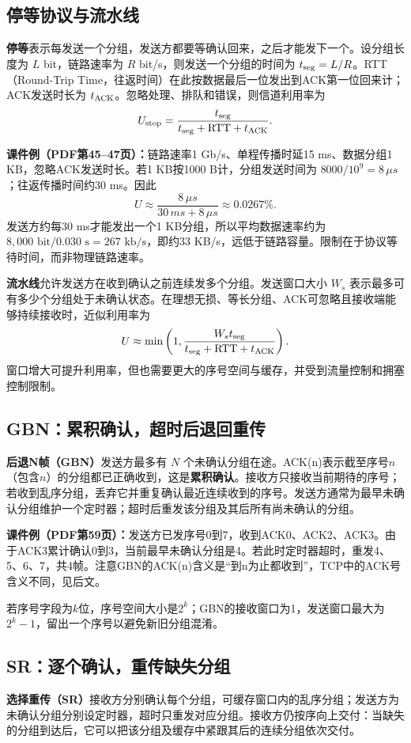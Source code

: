 \subsection{停等协议与流水线}
\textbf{停等}表示每发送一个分组，发送方都要等确认回来，之后才能发下一个。设分组长度为 $L$ bit，链路速率为 $R$ bit/s，则发送一个分组的时间为 $t_{\rm seg}=L/R$。RTT（Round-Trip Time，往返时间）在此按数据最后一位发出到ACK第一位回来计；ACK发送时长为 $t_{\rm ACK}$。忽略处理、排队和错误，则信道利用率为
\[
U_{\rm stop}=\frac{t_{\rm seg}}{t_{\rm seg}+\mathrm{RTT}+t_{\rm ACK}}.
\]

\textbf{课件例（PDF第45--47页）：}链路速率1 Gb/s、单程传播时延15 ms、数据分组1 KB，忽略ACK发送时长。若1 KB按1000 B计，分组发送时间为 $8000/10^9=8\,\mu s$；往返传播时间约30 ms。因此
\[
U\approx\frac{8\,\mu s}{30\,ms+8\,\mu s}\approx0.0267\%.
\]
发送方约每30 ms才能发出一个1 KB分组，所以平均数据速率约为$8{,}000\text{ bit}/0.030\text{ s}=267\text{ kb/s}$，即约33 KB/s，远低于链路容量。限制在于协议等待时间，而非物理链路速率。

\textbf{流水线}允许发送方在收到确认之前连续发多个分组。发送窗口大小 $W_s$ 表示最多可有多少个分组处于未确认状态。在理想无损、等长分组、ACK可忽略且接收端能够持续接收时，近似利用率为
\[
U\approx\min\left(1,\frac{W_s t_{\rm seg}}{t_{\rm seg}+\mathrm{RTT}+t_{\rm ACK}}\right).
\]
窗口增大可提升利用率，但也需要更大的序号空间与缓存，并受到流量控制和拥塞控制限制。

\annotationarea[4]

\subsection{GBN：累积确认，超时后退回重传}
\textbf{后退N帧（GBN）}发送方最多有 $N$ 个未确认分组在途。ACK(n)表示截至序号$n$（包含$n$）的分组都已正确收到，这是\textbf{累积确认}。接收方只接收当前期待的序号；若收到乱序分组，丢弃它并重复确认最近连续收到的序号。发送方通常为最早未确认分组维护一个定时器；超时后重发该分组及其后所有尚未确认的分组。

\textbf{课件例（PDF第59页）：}发送方已发序号0到7，收到ACK0、ACK2、ACK3。由于ACK3累计确认0到3，当前最早未确认分组是4。若此时定时器超时，重发4、5、6、7，共4帧。注意GBN的ACK(n)含义是“到n为止都收到”，TCP中的ACK号含义不同，见后文。

若序号字段为$k$位，序号空间大小是$2^k$；GBN的接收窗口为1，发送窗口最大为$2^k-1$，留出一个序号以避免新旧分组混淆。

\annotationarea[4]

\subsection{SR：逐个确认，重传缺失分组}
\textbf{选择重传（SR）}接收方分别确认每个分组，可缓存窗口内的乱序分组；发送方为未确认分组分别设定时器，超时只重发对应分组。接收方仍按序向上交付：当缺失的分组到达后，它可以把该分组及缓存中紧跟其后的连续分组依次交付。

